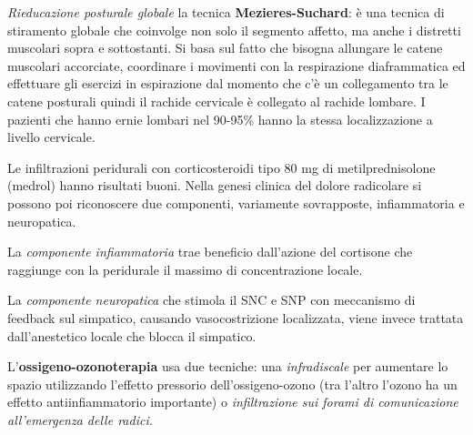 \emph{\emph{Rieducazione posturale globale}} la tecnica
\textbf{Mezieres-Suchard}: è una tecnica di stiramento globale che
coinvolge non solo il segmento affetto, ma anche i distretti muscolari
sopra e sottostanti. Si basa sul fatto che bisogna allungare le catene
muscolari accorciate, coordinare i movimenti con la respirazione
diaframmatica ed effettuare gli esercizi in espirazione dal momento che
c'è un collegamento tra le catene posturali quindi il rachide cervicale
è collegato al rachide lombare. I pazienti che hanno ernie lombari nel
90-95\% hanno la stessa localizzazione a livello cervicale.

Le infiltrazioni peridurali con corticosteroidi tipo 80 mg di
metilprednisolone (medrol) hanno risultati buoni. Nella genesi clinica
del dolore radicolare si possono poi riconoscere due componenti,
variamente sovrapposte, infiammatoria e neuropatica.

La \emph{componente infiammatoria} trae beneficio dall'azione del
cortisone che raggiunge con la peridurale il massimo di concentrazione
locale.

La \emph{componente neuropatica} che stimola il SNC e SNP con meccanismo
di feedback sul simpatico, causando vasocostrizione localizzata, viene
invece trattata dall'anestetico locale che blocca il simpatico.

L'\textbf{ossigeno-ozonoterapia} usa due tecniche: una
\emph{infradiscale} per aumentare lo spazio utilizzando l'effetto
pressorio dell'ossigeno-ozono (tra l'altro l'ozono ha un effetto
antiinfiammatorio importante) o \emph{infiltrazione sui forami di
comunicazione all'emergenza delle radici.}


